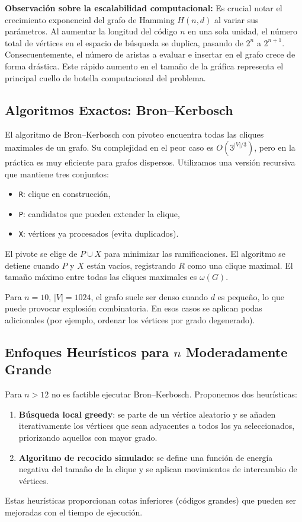 \documentclass[12pt, spanish]{article}
\begin{document}
\vspace{0.5cm} 
\noindent\textbf{Observación sobre la escalabilidad computacional:} 
Es crucial notar el crecimiento exponencial del grafo de Hamming $H(n,d)$ al variar sus parámetros. Al aumentar la longitud del código $n$ en una sola unidad, el número total de vértices en el espacio de búsqueda se duplica, pasando de $2^n$ a $2^{n+1}$. Consecuentemente, el número de aristas a evaluar e insertar en el grafo crece de forma drástica. Este rápido aumento en el tamaño de la gráfica representa el principal cuello de botella computacional del problema.
\vspace{0.5cm}

\subsection{Algoritmos Exactos: Bron–Kerbosch}
El algoritmo de Bron–Kerbosch con pivoteo encuentra todas las cliques maximales de un grafo. Su complejidad en el peor caso es $O(3^{|V|/3})$, pero en la práctica es muy eficiente para grafos dispersos. Utilizamos una versión recursiva que mantiene tres conjuntos:
\begin{itemize}
    \item \texttt{R}: clique en construcción,
    \item \texttt{P}: candidatos que pueden extender la clique,
    \item \texttt{X}: vértices ya procesados (evita duplicados).
\end{itemize}
El pivote se elige de $P \cup X$ para minimizar las ramificaciones. El algoritmo se detiene cuando $P$ y $X$ están vacíos, registrando $R$ como una clique maximal. El tamaño máximo entre todas las cliques maximales es $\omega(G)$.

Para $n=10$, $|V|=1024$, el grafo suele ser denso cuando $d$ es pequeño, lo que puede provocar explosión combinatoria. En esos casos se aplican podas adicionales (por ejemplo, ordenar los vértices por grado degenerado).

\subsection{Enfoques Heurísticos para $n$ Moderadamente Grande}
Para $n > 12$ no es factible ejecutar Bron–Kerbosch. Proponemos dos heurísticas:
\begin{enumerate}
    \item \textbf{Búsqueda local greedy}: se parte de un vértice aleatorio y se añaden iterativamente los vértices que sean adyacentes a todos los ya seleccionados, priorizando aquellos con mayor grado.
    \item \textbf{Algoritmo de recocido simulado}: se define una función de energía negativa del tamaño de la clique y se aplican movimientos de intercambio de vértices.
\end{enumerate}
Estas heurísticas proporcionan cotas inferiores (códigos grandes) que pueden ser mejoradas con el tiempo de ejecución.
\end{document}
